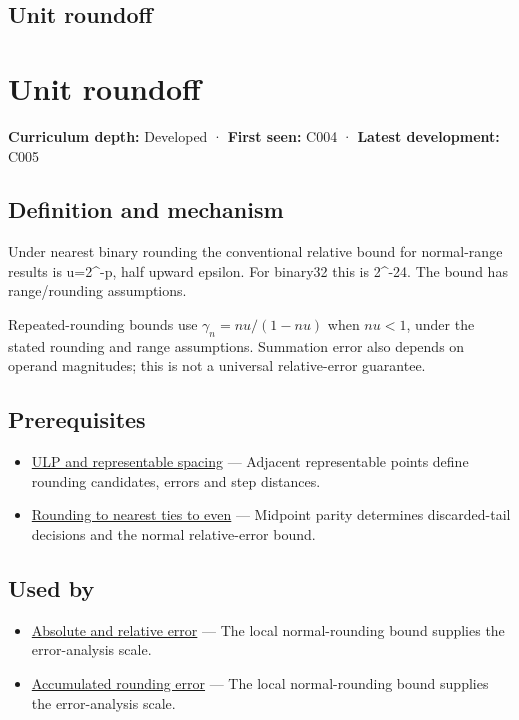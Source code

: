 \hypertarget{appendix-bc44f7b42f42}{}
\section*{Unit roundoff}
\chapter{Unit roundoff}\label{appendix-bc44f7b42f42-unit-roundoff}

\textbf{Curriculum depth:} Developed · \textbf{First seen:} C004 · \textbf{Latest development:} C005

\section{Definition and mechanism}\label{appendix-bc44f7b42f42-definition-and-mechanism}

Under nearest binary rounding the conventional relative bound for normal-range results is u=2\^{}-p, half upward epsilon. For binary32 this is 2\^{}-24. The bound has range/rounding assumptions.

Repeated-rounding bounds use \(\gamma_n=nu/(1-nu)\) when \(nu<1\), under the stated rounding and range assumptions. Summation error also depends on operand magnitudes; this is not a universal relative-error guarantee.

\section{Prerequisites}\label{appendix-bc44f7b42f42-prerequisites}

\begin{itemize}
\tightlist
\item
  \hyperref[appendix-14bab4cab9d4]{ULP and representable spacing} --- Adjacent representable points define rounding candidates, errors and step distances.
\item
  \hyperref[appendix-614afe1de592]{Rounding to nearest ties to even} --- Midpoint parity determines discarded-tail decisions and the normal relative-error bound.
\end{itemize}

\section{Used by}\label{appendix-bc44f7b42f42-used-by}

\begin{itemize}
\tightlist
\item
  \hyperref[appendix-3ae74e89b4e6]{Absolute and relative error} --- The local normal-rounding bound supplies the error-analysis scale.
\item
  \hyperref[appendix-f82e270791c8]{Accumulated rounding error} --- The local normal-rounding bound supplies the error-analysis scale.
\end{itemize}

